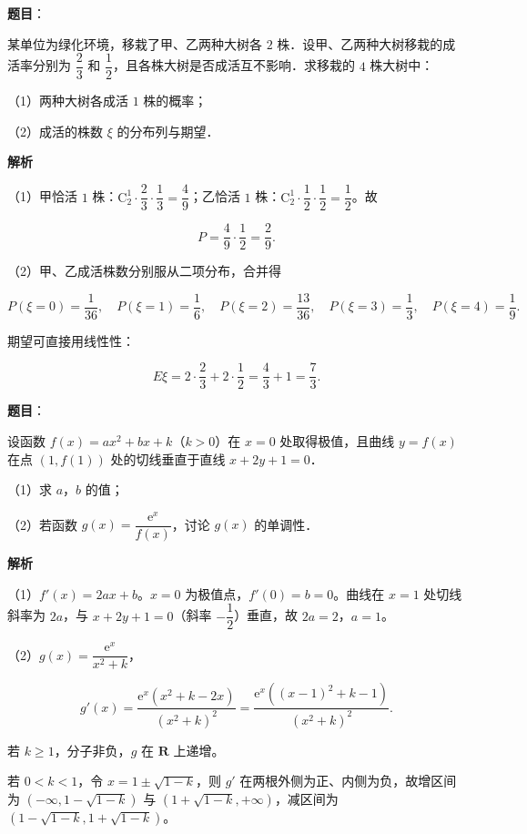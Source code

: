 \begin{answer}

\textbf{题目}：

某单位为绿化环境，移栽了甲、乙两种大树各 $2$ 株．设甲、乙两种大树移栽的成活率分别为 $\dfrac23$ 和 $\dfrac12$，且各株大树是否成活互不影响．求移栽的 $4$ 株大树中：

（1）两种大树各成活 $1$ 株的概率；

（2）成活的株数 $\xi$ 的分布列与期望．

\textbf{解析}

（1）甲恰活 $1$ 株：$\mathrm C_2^1\cdot\dfrac23\cdot\dfrac13=\dfrac49$；乙恰活 $1$ 株：$\mathrm C_2^1\cdot\dfrac12\cdot\dfrac12=\dfrac12$。故

\nopagebreak[4]
\[P=\frac49\cdot\frac12=\frac29.\]

（2）甲、乙成活株数分别服从二项分布，合并得

\nopagebreak[4]
\[P(\xi=0)=\frac1{36},\quad P(\xi=1)=\frac16,\quad P(\xi=2)=\frac{13}{36},\quad P(\xi=3)=\frac13,\quad P(\xi=4)=\frac19.\]

期望可直接用线性性：

\nopagebreak[4]
\[E\xi=2\cdot\frac23+2\cdot\frac12=\frac43+1=\frac73.\]


\end{answer}
\begin{answer}

\textbf{题目}：

设函数 $f(x)=ax^2+bx+k$（$k>0$）在 $x=0$ 处取得极值，且曲线 $y=f(x)$ 在点 $(1,f(1))$ 处的切线垂直于直线 $x+2y+1=0$．

（1）求 $a$，$b$ 的值；

（2）若函数 $g(x)=\dfrac{\mathrm e^x}{f(x)}$，讨论 $g(x)$ 的单调性．

\textbf{解析}

（1）$f'(x)=2ax+b$。$x=0$ 为极值点，$f'(0)=b=0$。曲线在 $x=1$ 处切线斜率为 $2a$，与 $x+2y+1=0$（斜率 $-\dfrac12$）垂直，故 $2a=2$，$a=1$。

（2）$g(x)=\dfrac{\mathrm e^x}{x^2+k}$，

\nopagebreak[4]
\[g'(x)=\frac{\mathrm e^x(x^2+k-2x)}{(x^2+k)^2}
=\frac{\mathrm e^x\left((x-1)^2+k-1\right)}{(x^2+k)^2}.\]

若 $k\geqslant1$，分子非负，$g$ 在 $\mathbf R$ 上递增。

若 $0<k<1$，令 $x=1\pm\sqrt{1-k}$，则 $g'$ 在两根外侧为正、内侧为负，故增区间为 $(-\infty,1-\sqrt{1-k})$ 与 $(1+\sqrt{1-k},+\infty)$，减区间为 $(1-\sqrt{1-k},1+\sqrt{1-k})$。


\end{answer}
